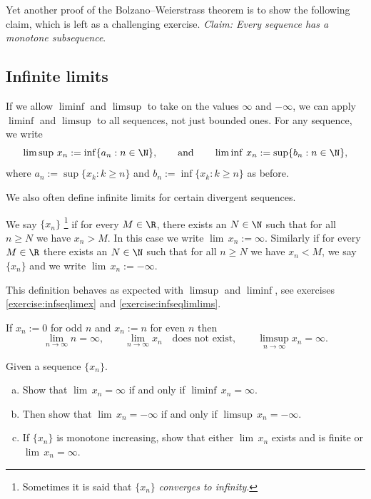 \documentclass[12pt]{book}
\begin{document}
Yet another proof of the Bolzano--Weierstrass theorem is to show the
following claim,
which is left as a challenging exercise.
\emph{Claim: Every sequence has a monotone subsequence}.

\subsection*{Infinite limits}

If we allow $\liminf$ and $\limsup$ to take on
the values $\infty$ and $-\infty$, we can apply $\liminf$ and $\limsup$
to all sequences, not just
bounded ones.
For any sequence, we 
write
\begin{equation*}
\limsup \, x_n := \inf \{ a_n : n \in \N \}, \qquad \text{and} \qquad
\liminf \, x_n := \sup \{ b_n : n \in \N \},
\end{equation*}
where 
$a_n := \sup \{ x_k : k \geq n \}$ and
$b_n := \inf \{ x_k : k \geq n \}$ as before.

We also often define infinite limits for certain divergent sequences.

\begin{defn}
We say
$\{ x_n \}$ \emph{}%
\footnote{Sometimes it is said that $\{ x_n \}$ \emph{converges to infinity}.}
if for every $M \in
\R$, there exists an $N \in \N$ such that for all $n \geq N$ we have $x_n >
M$.
In this case we write $\lim \, x_n := \infty$.
Similarly
if for every $M \in \R$ there exists an $N \in \N$ such that
for all $n \geq N$ we have $x_n < M$, we say $\{ x_n \}$
\emph{} and we write
$\lim \, x_n := -\infty$.
\end{defn}

This definition behaves as expected with
$\limsup$ and $\liminf$, see exercises \ref{exercise:infseqlimex}
and \ref{exercise:infseqlimlims}.

\begin{example}
If $x_n := 0$ for odd $n$ and $x_n := n$ for even $n$
then
\begin{equation*}
\lim_{n\to \infty} n = \infty,
\qquad 
\lim_{n\to \infty} x_n \quad \text{does not exist},
\qquad 
\limsup_{n\to \infty} x_n = \infty.
\end{equation*}
\end{example}

\begin{exercise} \label{exercise:infseqlimlims}
Given a sequence $\{ x_n \}$.  
\begin{enumerate}[a)]
 \item Show that
$\lim \, x_n = \infty$ if and only if $\liminf \, x_n = \infty$.
\item Then show that $\lim \, x_n = - \infty$ if and only if $\limsup \, x_n = -\infty$.
\item If $\{ x_n \}$ is monotone increasing, show that either
$\lim \, x_n$ exists and is finite or $\lim \, x_n = \infty$.
\end{enumerate}
\end{exercise}
\end{document}
